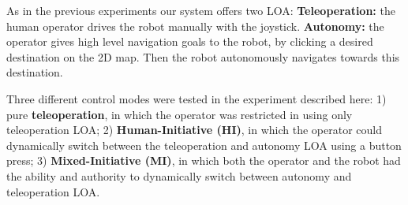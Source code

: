 \documentclass[a4paper,12pt,oneside,openright]{bhamthesis}
\begin{document}
As in the previous experiments our system offers two LOA: \textbf{Teleoperation:} the human operator drives the robot manually with the joystick. \textbf{Autonomy:} the operator gives high level navigation goals to the robot, by clicking a desired destination on the 2D map. Then the robot autonomously navigates towards this destination. 

Three different control modes were tested in the experiment described here: 1) pure \textbf{teleoperation}, in which the operator was restricted in using only teleoperation LOA; 2) \textbf{Human-Initiative (HI)}, in which the operator could dynamically switch between the teleoperation and autonomy LOA using a button press; 3) \textbf{Mixed-Initiative (MI)}, in which both the operator and the robot had the ability and authority to dynamically switch between autonomy and teleoperation LOA.
\end{document}

